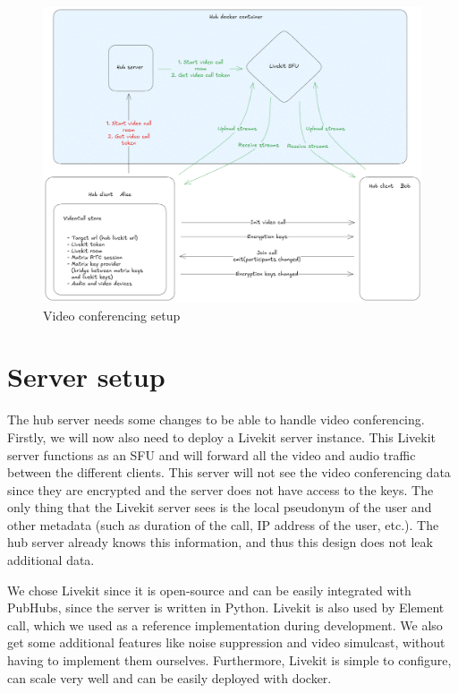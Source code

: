 \documentclass{report}
\begin{document}
\begin{figure}[!hbt]
\centering
\includegraphics[width=1\textwidth]{img/PH_videocall.excalidraw.png}
\caption{Video conferencing setup}
\label{fig:video-conference-setup}
\end{figure}


\section{Server setup}\label{sec:server-setup}
The hub server needs some changes to be able to handle video conferencing. Firstly, we will now also need to deploy a
Livekit server instance. This Livekit server functions as an SFU and will forward all the video and audio traffic
between the different clients. This server will not see the video conferencing data since they are
encrypted and the server does not have access to the keys. The only thing that the Livekit server sees is the local
pseudonym of the user and other metadata (such as duration of the call, IP address of the user, etc.). The hub
server already knows this information, and thus this design does not leak additional data.

We chose Livekit since it is open-source and can be easily integrated with PubHubs, since the server is written in
Python. Livekit is also used by Element call, which we used as a reference implementation during development. We
also get some additional features like noise suppression and video simulcast, without having to implement them
ourselves. Furthermore, Livekit is simple to configure, can scale very well and can be easily deployed with docker.
\end{document}
